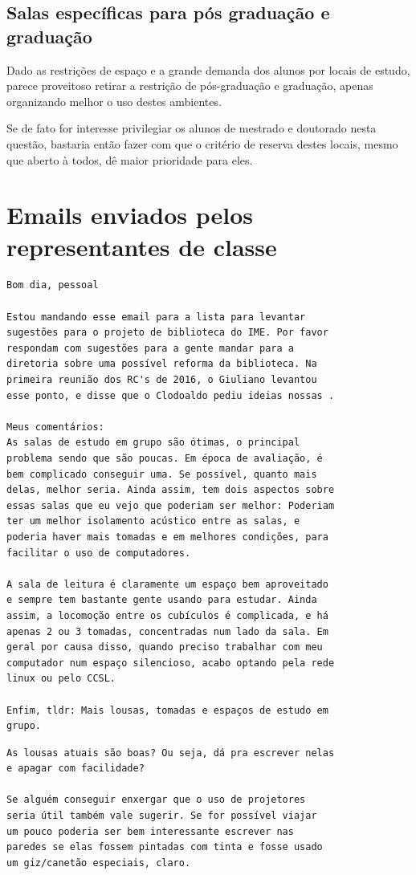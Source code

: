 \documentclass[titlepage]{article}
\begin{document}
\subsection{Salas específicas para pós graduação e graduação}
Dado as restrições de espaço e a grande demanda dos alunos por locais de estudo,
parece proveitoso retirar a restrição de pós-graduação e graduação, apenas
organizando melhor o uso destes ambientes.

Se de fato for interesse privilegiar os alunos de mestrado e doutorado nesta
questão, bastaria então fazer com que o critério de reserva destes locais, mesmo
que aberto à todos, dê maior prioridade para eles.

\clearpage
\section{Emails enviados pelos representantes de classe}

\begin{lstlisting}[caption=Enviado por Nathan Proença]
Bom dia, pessoal

Estou mandando esse email para a lista para levantar 
sugestões para o projeto de biblioteca do IME. Por favor 
respondam com sugestões para a gente mandar para a 
diretoria sobre uma possível reforma da biblioteca. Na 
primeira reunião dos RC's de 2016, o Giuliano levantou 
esse ponto, e disse que o Clodoaldo pediu ideias nossas .  

Meus comentários:
As salas de estudo em grupo são ótimas, o principal 
problema sendo que são poucas. Em época de avaliação, é 
bem complicado conseguir uma. Se possível, quanto mais 
delas, melhor seria. Ainda assim, tem dois aspectos sobre 
essas salas que eu vejo que poderiam ser melhor: Poderiam 
ter um melhor isolamento acústico entre as salas, e 
poderia haver mais tomadas e em melhores condições, para 
facilitar o uso de computadores.

A sala de leitura é claramente um espaço bem aproveitado 
e sempre tem bastante gente usando para estudar. Ainda 
assim, a locomoção entre os cubículos é complicada, e há 
apenas 2 ou 3 tomadas, concentradas num lado da sala. Em 
geral por causa disso, quando preciso trabalhar com meu 
computador num espaço silencioso, acabo optando pela rede 
linux ou pelo CCSL.

Enfim, tldr: Mais lousas, tomadas e espaços de estudo em 
grupo.
\end{lstlisting}

\begin{lstlisting}[caption=Enviado por Jackson Souza]
As lousas atuais são boas? Ou seja, dá pra escrever nelas 
e apagar com facilidade? 

Se alguém conseguir enxergar que o uso de projetores 
seria útil também vale sugerir. Se for possível viajar 
um pouco poderia ser bem interessante escrever nas 
paredes se elas fossem pintadas com tinta e fosse usado 
um giz/canetão especiais, claro.
\end{lstlisting} 
\end{document}
